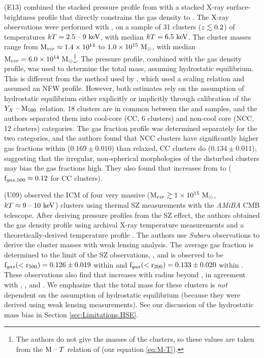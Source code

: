 \textbf{\citet{Eckert2013b}} (E13) combined the stacked pressure
profile from \citet{PlanckIntV} with a stacked X-ray
surface-brightness profile that directly constrains the gas density to
\rtwo{}. The X-ray observations were performed with \Rosat{}, on a
sample of 31 clusters ($z\lesssim0.2$) of temperatures $kT =
2.5\;\textrm{--}\;9~\textrm{keV}$, with median $kT = 6.5~\textrm{keV}$. The cluster masses range
from $\textrm{M\ensuremath{_{vir}}} \approx 1.4 \times 10^{14}$ to $1.0 \times 10^{15}~\textrm{M}_\odot$, with
median $\textrm{M\ensuremath{_{vir}}} = 6.0\times 10^{14}~\textrm{M}_\odot$\footnote{The authors do not give
  the masses of the clusters, so these values are taken from the
  $\textrm{M}{}\;\textrm{--}\;{}T$ relation of \citet{Vikhlinin2006} (our equation
  \ref{eq:M-T}).}. The \Planck{} pressure profile, combined with the
gas density profile, was used to determine the total mass, assuming
hydrostatic equilibrium. This is different from the method used by
\citet{PlanckIntV}, which used a scaling relation and assumed an NFW
profile. However, both estimates rely on the assumption of hydrostatic
equilibrium either explicitly or implicitly through calibration of the
$Y_X\;\textrm{--}\;\textrm{M\ensuremath{_{500}}}$ relation. 18 clusters are in common
between the \Rosat{} and \Planck{} samples, and the authors separated
them into cool-core (CC, 6 clusters) and non-cool core (NCC, 12
clusters) categories. The gas fraction profile was determined
separately for the two categories, and the authors found that NCC
clusters have significantly higher gas fractions within \rtwo{}
($0.169 \pm 0.010$) than relaxed, CC clusters do ($0.134\pm 0.011$),
suggesting that the irregular, non-spherical morphologies of the
disturbed clusters may bias the gas fractions high. They also found
that \fg{} increases from \rfive{} to \rtwo{} ($\textrm{f\ensuremath{_{gas,500}}} \approx
0.12$ for CC clusters).

\textbf{\citet{Umetsu2009}} (U09) observed the ICM of four very
massive ($\textrm{M\ensuremath{_{vir}}} \gtrsim 1\times 10^{15}~\textrm{M}_\odot$, $kT \approx 9\;\textrm{--}\;10~\textrm{keV}$)
clusters using thermal SZ measurements with the \textit{AMiBA} CMB
telescope. After deriving pressure profiles from the SZ effect, the
authors obtained the gas density profile using archival X-ray
temperature measurements and a theoretically-derived temperature
profile \citep{Komatsu2001}. The authors use \textit{Subaru}
observations to derive the cluster masses with weak lensing
analysis. The average gas fraction is determined to the limit of the
SZ observations, \rtwo, and is observed to be $\textrm{f\ensuremath{_{gas}}}(<\textrm{r\ensuremath{_{500}}}) = 0.126
\pm 0.019$ within \rfive{} and $\textrm{f\ensuremath{_{gas}}}(<\textrm{r\ensuremath{_{200}}}) = 0.133 \pm 0.020$ within
\rtwo{}. These observations also find that \fg{} increases with radius
beyond \rfive{}, in agreement with \citet{Rasheed2011},
\citet{PlanckIntV}, and \citet{Eckert2013b}. We emphasize that the
total mass for these clusters is \textit{not} dependent on the
assumption of hydrostatic equilibrium (because they were derived using
weak lensing measurements). See our discussion of the hydrostatic mass
bias in Section \ref{sec:Limitations.HSE}.

